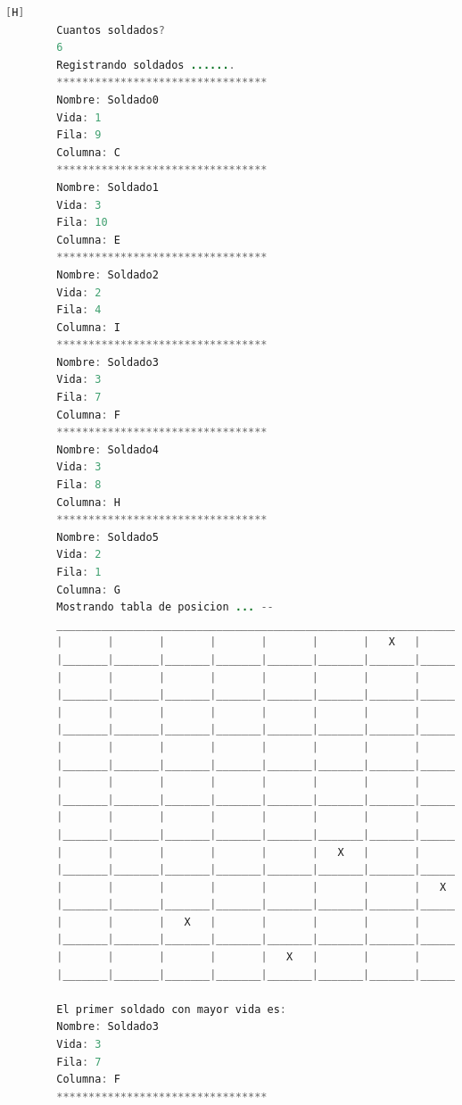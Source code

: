 \documentclass{article}
\begin{document}
	\begin{lstlisting}[language=java,caption={Las lineas de codigos del metodo creado: \textcolor{red}{VER EL TEXTO EN LATEX EN LA IMAGEN SE DEFORMA O EJECUTARLO}}][H]
		Cuantos soldados? 
		6
		Registrando soldados .......
		*********************************
		Nombre: Soldado0
		Vida: 1
		Fila: 9
		Columna: C
		*********************************
		Nombre: Soldado1
		Vida: 3
		Fila: 10
		Columna: E
		*********************************
		Nombre: Soldado2
		Vida: 2
		Fila: 4
		Columna: I
		*********************************
		Nombre: Soldado3
		Vida: 3
		Fila: 7
		Columna: F
		*********************************
		Nombre: Soldado4
		Vida: 3
		Fila: 8
		Columna: H
		*********************************
		Nombre: Soldado5
		Vida: 2
		Fila: 1
		Columna: G
		Mostrando tabla de posicion ... --
		_________________________________________________________________________________
		|       |       |       |       |       |       |   X   |       |       |       |
		|_______|_______|_______|_______|_______|_______|_______|_______|_______|_______|
		|       |       |       |       |       |       |       |       |       |       |
		|_______|_______|_______|_______|_______|_______|_______|_______|_______|_______|
		|       |       |       |       |       |       |       |       |       |       |
		|_______|_______|_______|_______|_______|_______|_______|_______|_______|_______|
		|       |       |       |       |       |       |       |       |   X   |       |
		|_______|_______|_______|_______|_______|_______|_______|_______|_______|_______|
		|       |       |       |       |       |       |       |       |       |       |
		|_______|_______|_______|_______|_______|_______|_______|_______|_______|_______|
		|       |       |       |       |       |       |       |       |       |       |
		|_______|_______|_______|_______|_______|_______|_______|_______|_______|_______|
		|       |       |       |       |       |   X   |       |       |       |       |
		|_______|_______|_______|_______|_______|_______|_______|_______|_______|_______|
		|       |       |       |       |       |       |       |   X   |       |       |
		|_______|_______|_______|_______|_______|_______|_______|_______|_______|_______|
		|       |       |   X   |       |       |       |       |       |       |       |
		|_______|_______|_______|_______|_______|_______|_______|_______|_______|_______|
		|       |       |       |       |   X   |       |       |       |       |       |
		|_______|_______|_______|_______|_______|_______|_______|_______|_______|_______|
		
		El primer soldado con mayor vida es: 
		Nombre: Soldado3
		Vida: 3
		Fila: 7
		Columna: F
		*********************************

	\end{lstlisting}
\end{document}
